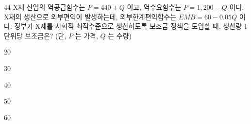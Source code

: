 \begin{question}{44}
X재 산업의 역공급함수는 $P=440+Q$ 이고, 역수요함수는 $P=1,200-Q$ 이다. X재의 생산으로 외부편익이 발생하는데, 외부한계편익함수는 $EMB=60-0.05Q$ 이다. 정부가 X재를 사회적 최적수준으로 생산하도록 보조금 정책을 도입할 때, 생산량 1단위당 보조금은? (단, $P$ 는 가격, $Q$ 는 수량)
\begin{choices}
  \item 20
  \item 30
  \item 40
  \item 50
  \item 60
\end{choices}
\end{question}
